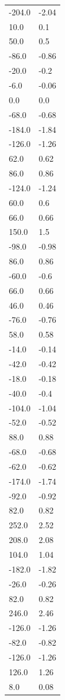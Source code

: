 \begin{longtable}{ll}
-204.0 & -2.04 \\
10.0 & 0.1 \\
50.0 & 0.5 \\
-86.0 & -0.86 \\
-20.0 & -0.2 \\
-6.0 & -0.06 \\
0.0 & 0.0 \\
-68.0 & -0.68 \\
-184.0 & -1.84 \\
-126.0 & -1.26 \\
62.0 & 0.62 \\
86.0 & 0.86 \\
-124.0 & -1.24 \\
60.0 & 0.6 \\
66.0 & 0.66 \\
150.0 & 1.5 \\
-98.0 & -0.98 \\
86.0 & 0.86 \\
-60.0 & -0.6 \\
66.0 & 0.66 \\
46.0 & 0.46 \\
-76.0 & -0.76 \\
58.0 & 0.58 \\
-14.0 & -0.14 \\
-42.0 & -0.42 \\
-18.0 & -0.18 \\
-40.0 & -0.4 \\
-104.0 & -1.04 \\
-52.0 & -0.52 \\
88.0 & 0.88 \\
-68.0 & -0.68 \\
-62.0 & -0.62 \\
-174.0 & -1.74 \\
-92.0 & -0.92 \\
82.0 & 0.82 \\
252.0 & 2.52 \\
208.0 & 2.08 \\
104.0 & 1.04 \\
-182.0 & -1.82 \\
-26.0 & -0.26 \\
82.0 & 0.82 \\
246.0 & 2.46 \\
-126.0 & -1.26 \\
-82.0 & -0.82 \\
-126.0 & -1.26 \\
126.0 & 1.26 \\
8.0 & 0.08 \\

\end{longtable}

